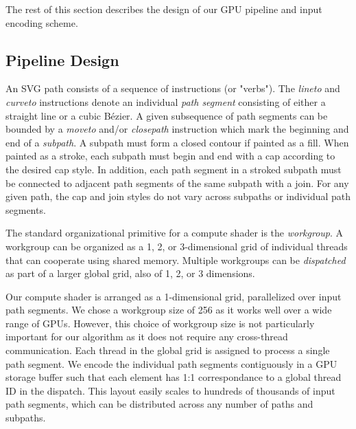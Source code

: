 \documentclass[sigconf, authordraft]{acmart}
\begin{document}
The rest of this section describes the design of our GPU pipeline and input encoding scheme.


\subsection{Pipeline Design} \label{subsec:pipeline-design}

An SVG path consists of a sequence of instructions (or "verbs"). The \emph{lineto} and \emph{curveto} instructions denote an individual \emph{path segment} consisting of either a straight line or a cubic Bézier. A given subsequence of path segments can be bounded by a \emph{moveto} and/or \emph{closepath} instruction which mark the beginning and end of a \emph{subpath}. A subpath must form a closed contour if painted as a fill. When painted as a stroke, each subpath must begin and end with a cap according to the desired cap style. In addition, each path segment in a stroked subpath must be connected to adjacent path segments of the same subpath with a join. For any given path, the cap and join styles do not vary across subpaths or individual path segments.

The standard organizational primitive for a compute shader is the \emph{workgroup}. A workgroup can be organized as a 1, 2, or 3-dimensional grid of individual threads that can cooperate using shared memory. Multiple workgroups can be \emph{dispatched} as part of a larger global grid, also of 1, 2, or 3 dimensions.

Our compute shader is arranged as a 1-dimensional grid, parallelized over input path segments. We chose a workgroup size of 256 as it works well over a wide range of GPUs. However, this choice of workgroup size is not particularly important for our algorithm as it does not require any cross-thread communication. Each thread in the global grid is assigned to process a single path segment. We encode the individual path segments contiguously in a GPU storage buffer such that each element has 1:1 correspondance to a global thread ID in the dispatch. This layout easily scales to hundreds of thousands of input path segments, which can be distributed across any number of paths and subpaths.
\end{document}
